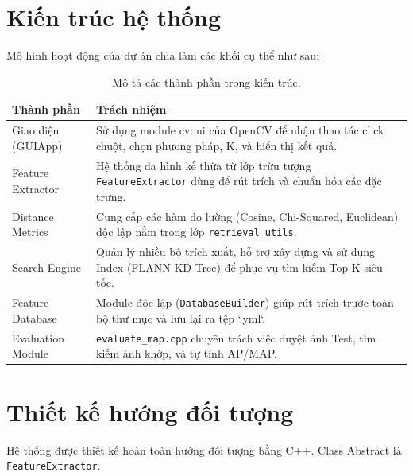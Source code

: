 \section{Kiến trúc hệ thống}
Mô hình hoạt động của dự án chia làm các khối cụ thể như sau:

\begin{table}[H]
\centering
\begin{tabularx}{\textwidth}{|l|X|}
\hline
\textbf{Thành phần} & \textbf{Trách nhiệm} \\
\hline
Giao diện (GUIApp) & Sử dụng module cv::ui của OpenCV để nhận thao tác click chuột, chọn phương pháp, K, và hiển thị kết quả. \\
\hline
Feature Extractor & Hệ thống đa hình kế thừa từ lớp trừu tượng \texttt{FeatureExtractor} dùng để rút trích và chuẩn hóa các đặc trưng. \\
\hline
Distance Metrics & Cung cấp các hàm đo lường (Cosine, Chi-Squared, Euclidean) độc lập nằm trong lớp \texttt{retrieval\_utils}. \\
\hline
Search Engine & Quản lý nhiều bộ trích xuất, hỗ trợ xây dựng và sử dụng Index (FLANN KD-Tree) để phục vụ tìm kiếm Top-K siêu tốc. \\
\hline
Feature Database & Module độc lập (\texttt{DatabaseBuilder}) giúp rút trích trước toàn bộ thư mục và lưu lại ra tệp `.yml`. \\
\hline
Evaluation Module & \texttt{evaluate\_map.cpp} chuyên trách việc duyệt ảnh Test, tìm kiếm ảnh khớp, và tự tính AP/MAP. \\
\hline
\end{tabularx}
\caption{Mô tả các thành phần trong kiến trúc.}
\end{table}

\section{Thiết kế hướng đối tượng}


Hệ thống được thiết kế hoàn toàn hướng đối tượng bằng C++. Class Abstract là \texttt{FeatureExtractor}.

